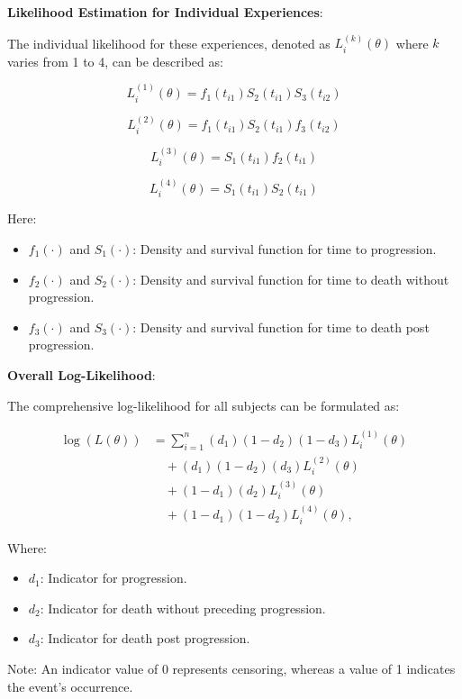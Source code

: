 \documentclass[12pt]{article}
\begin{document}
\textbf{Likelihood Estimation for Individual Experiences}:

The individual likelihood for these experiences, denoted as \( L_i^{(k)}(\theta) \) where \( k \) varies from 1 to 4, can be described as:

\[
L_i^{(1)}(\theta) = f_1(t_{i1})S_2(t_{i1})S_3(t_{i2})
\]

\[
L_i^{(2)}(\theta) = f_1(t_{i1})S_2(t_{i1})f_3(t_{i2})
\]

\[
L_i^{(3)}(\theta) = S_1(t_{i1})f_2(t_{i1})
\]

\[
L_i^{(4)}(\theta) = S_1(t_{i1})S_2(t_{i1})
\]

Here:

\begin{itemize}
    \item \( f_1(\cdot) \) and \( S_1(\cdot) \): Density and survival function for time to progression.
    \item \( f_2(\cdot) \) and \( S_2(\cdot) \): Density and survival function for time to death without progression.
    \item \( f_3(\cdot) \) and \( S_3(\cdot) \): Density and survival function for time to death post progression.
\end{itemize}

\textbf{Overall Log-Likelihood}:

The comprehensive log-likelihood for all subjects can be formulated as:

\[
\begin{aligned}
\log(L(\theta)) &= \sum_{i=1}^{n}(d_1)(1-d_2)(1-d_3)L_i^{(1)}(\theta) \\
&\quad + (d_1)(1-d_2)(d_3)L_i^{(2)}(\theta) \\
&\quad +(1-d_1)(d_2)L_i^{(3)}(\theta) \\
&\quad +(1-d_1)(1-d_2)L_i^{(4)}(\theta),
\end{aligned}
\]

Where:

\begin{itemize}
    \item \( d_1 \): Indicator for progression.
    \item \( d_2 \): Indicator for death without preceding progression.
    \item \( d_3 \): Indicator for death post progression.
\end{itemize}

Note: An indicator value of 0 represents censoring, whereas a value of 1 indicates the event's occurrence.
\end{document}
